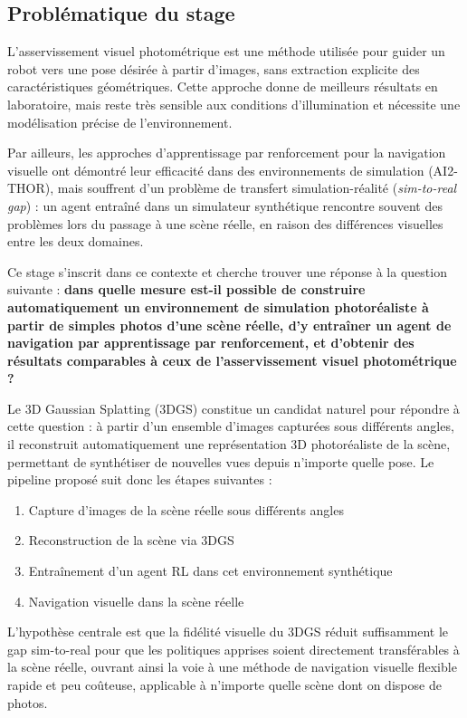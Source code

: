 \subsection{Problématique du stage}

L'asservissement visuel photométrique est une méthode utilisée pour guider un robot vers une pose désirée à partir d'images, sans extraction explicite des caractéristiques géométriques. Cette approche donne de meilleurs résultats en laboratoire, mais reste très sensible aux conditions d'illumination et nécessite une modélisation précise de l'environnement.

Par ailleurs, les approches d'apprentissage par renforcement pour la navigation visuelle ont démontré leur efficacité dans des environnements 
de simulation (AI2-THOR), mais souffrent d'un problème de transfert simulation-réalité (\textit{sim-to-real gap}) : un agent 
entraîné dans un simulateur synthétique rencontre souvent des problèmes lors du passage à une scène réelle, en raison des différences visuelles entre les 
deux domaines.

Ce stage s'inscrit dans ce contexte et cherche trouver une réponse à la question suivante : \textbf{dans quelle mesure est-il possible de construire automatiquement un  environnement de simulation photoréaliste à partir de simples photos  d'une scène réelle, d'y entraîner un agent de navigation par 
apprentissage par renforcement, et d'obtenir des résultats comparables à ceux de l'asservissement visuel photométrique ?}

Le 3D Gaussian Splatting (3DGS) constitue un candidat naturel pour répondre à cette question : à partir d'un ensemble d'images capturées sous différents angles, il reconstruit automatiquement une représentation 
3D photoréaliste de la scène, permettant de synthétiser de nouvelles vues depuis n'importe quelle pose. Le pipeline proposé suit donc les étapes suivantes :

\begin{enumerate}[noitemsep, topsep=4pt]
    \item Capture d'images de la scène réelle sous différents angles
    \item Reconstruction de la scène via 3DGS
    \item Entraînement d'un agent RL dans cet environnement synthétique
    \item Navigation visuelle dans la scène réelle
\end{enumerate}

L'hypothèse centrale est que la fidélité visuelle du 3DGS réduit suffisamment le gap sim-to-real pour que les politiques apprises soient  directement transférables à la scène réelle, ouvrant ainsi la voie à une méthode de navigation visuelle flexible rapide et peu coûteuse, applicable à n'importe quelle scène dont on dispose de photos.